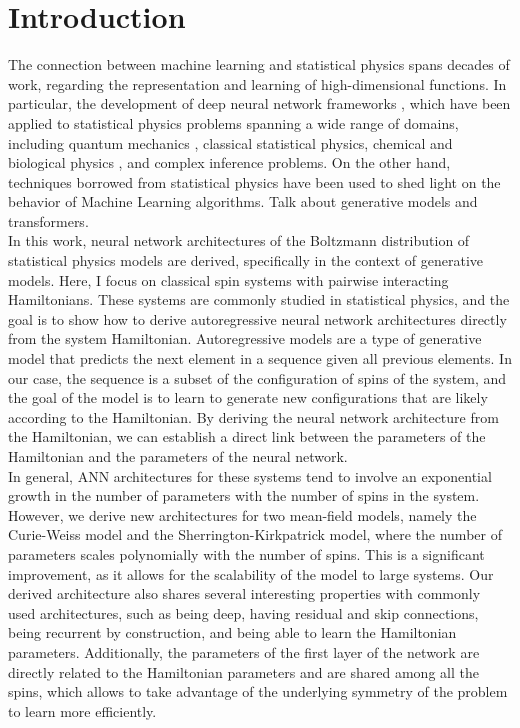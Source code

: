 \documentclass[aps,physrev,10pt,floatfix,longbibliography,nofootinbib,reprint]{revtex4-2}
\begin{document}
    
\maketitle
\tableofcontents
\section{Introduction}
The connection between machine learning and statistical physics spans decades of work, regarding the representation and learning of high-dimensional functions. 
In particular, the development of deep neural network frameworks \cite{bengioNatureDeepLearning2015}, which have been applied to statistical physics problems \cite{RevModPhys.91.045002} spanning a wide range of domains, including quantum mechanics \cite{Carleo2017}, 
classical statistical physics, chemical and biological physics \cite{noe2019boltzmann, jumper2021highly}, and complex inference problems.
On the other hand, techniques borrowed from statistical physics have been used to shed light on the behavior of Machine Learning algorithms.
Talk about generative models and transformers.\\
In this work, neural network architectures of the Boltzmann distribution of statistical physics models are derived, specifically in the context of generative models.
Here, I focus on classical spin systems with pairwise interacting Hamiltonians. These systems are commonly studied in statistical physics, and the goal is to show how to derive autoregressive neural network architectures directly from the system Hamiltonian. Autoregressive models are a type of generative model that predicts the next element in a sequence given all previous elements. In our case, the sequence is a subset of the configuration of spins of the system, and the goal of the model is to learn to generate new configurations that are likely according to the Hamiltonian. By deriving the neural network architecture from the Hamiltonian, we can establish a direct link between the parameters of the Hamiltonian and the parameters of the neural network.\\
In general, ANN architectures for these systems tend to involve an exponential growth in the number of parameters with the number of spins in the system. However, we derive new architectures for two mean-field models, namely the Curie-Weiss model and the Sherrington-Kirkpatrick model, where the number of parameters scales polynomially with the number of spins. This is a significant improvement, as it allows for the scalability of the model to large systems. Our derived architecture also shares several interesting properties with commonly used architectures, such as being deep, having residual and skip connections, being recurrent by construction, and being able to learn the Hamiltonian parameters. Additionally, the parameters of the first layer of the network are directly related to the Hamiltonian parameters and are shared among all the spins, which allows to take advantage of the underlying symmetry of the problem to learn more efficiently.\\
            
\end{document}
